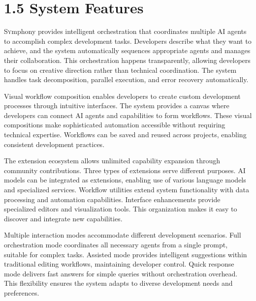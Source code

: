 
\section{1.5 System Features}
\label{sec:features}

\lettrine{S}ymphony provides intelligent orchestration that coordinates multiple AI agents to accomplish complex development tasks. Developers describe what they want to achieve, and the system automatically sequences appropriate agents and manages their collaboration. This orchestration happens transparently, allowing developers to focus on creative direction rather than technical coordination. The system handles task decomposition, parallel execution, and error recovery automatically.

Visual workflow composition enables developers to create custom development processes through intuitive interfaces. The system provides a canvas where developers can connect AI agents and capabilities to form workflows. These visual compositions make sophisticated automation accessible without requiring technical expertise. Workflows can be saved and reused across projects, enabling consistent development practices.

The extension ecosystem allows unlimited capability expansion through community contributions. Three types of extensions serve different purposes. AI models can be integrated as extensions, enabling use of various language models and specialized services. Workflow utilities extend system functionality with data processing and automation capabilities. Interface enhancements provide specialized editors and visualization tools. This organization makes it easy to discover and integrate new capabilities.

Multiple interaction modes accommodate different development scenarios. Full orchestration mode coordinates all necessary agents from a single prompt, suitable for complex tasks. Assisted mode provides intelligent suggestions within traditional editing workflows, maintaining developer control. Quick response mode delivers fast answers for simple queries without orchestration overhead. This flexibility ensures the system adapts to diverse development needs and preferences.
